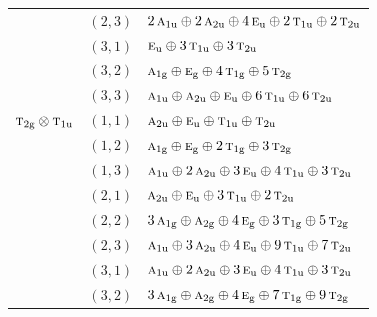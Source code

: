 \documentclass[11pt]{article}
\newcommand{\irr}[1]{\text{\normalfont\scshape #1}}
\newcommand{\ptag}[1]{\mathrm{#1}}
\begin{document}
\begin{longtable}{p{} c p{}}
 & $(2,3)$ & $2\,\irr{a}_{1\ptag{u}}\oplus 2\,\irr{a}_{2\ptag{u}}\oplus 4\,\irr{e}_{\ptag{u}}\oplus 2\,\irr{t}_{1\ptag{u}}\oplus 2\,\irr{t}_{2\ptag{u}}$\\

 & $(3,1)$ & $\irr{e}_{\ptag{u}}\oplus 3\,\irr{t}_{1\ptag{u}}\oplus 3\,\irr{t}_{2\ptag{u}}$\\

 & $(3,2)$ & $\irr{a}_{1\ptag{g}}\oplus \irr{e}_{\ptag{g}}\oplus 4\,\irr{t}_{1\ptag{g}}\oplus 5\,\irr{t}_{2\ptag{g}}$\\

 & $(3,3)$ & $\irr{a}_{1\ptag{u}}\oplus \irr{a}_{2\ptag{u}}\oplus \irr{e}_{\ptag{u}}\oplus 6\,\irr{t}_{1\ptag{u}}\oplus 6\,\irr{t}_{2\ptag{u}}$\\

\hline

$\irr{t}_{2\ptag{g}}\otimes \irr{t}_{1\ptag{u}}$ & $(1,1)$ & $\irr{a}_{2\ptag{u}}\oplus \irr{e}_{\ptag{u}}\oplus \irr{t}_{1\ptag{u}}\oplus \irr{t}_{2\ptag{u}}$\\

 & $(1,2)$ & $\irr{a}_{1\ptag{g}}\oplus \irr{e}_{\ptag{g}}\oplus 2\,\irr{t}_{1\ptag{g}}\oplus 3\,\irr{t}_{2\ptag{g}}$\\

 & $(1,3)$ & $\irr{a}_{1\ptag{u}}\oplus 2\,\irr{a}_{2\ptag{u}}\oplus 3\,\irr{e}_{\ptag{u}}\oplus 4\,\irr{t}_{1\ptag{u}}\oplus 3\,\irr{t}_{2\ptag{u}}$\\

 & $(2,1)$ & $\irr{a}_{2\ptag{u}}\oplus \irr{e}_{\ptag{u}}\oplus 3\,\irr{t}_{1\ptag{u}}\oplus 2\,\irr{t}_{2\ptag{u}}$\\

 & $(2,2)$ & $3\,\irr{a}_{1\ptag{g}}\oplus \irr{a}_{2\ptag{g}}\oplus 4\,\irr{e}_{\ptag{g}}\oplus 3\,\irr{t}_{1\ptag{g}}\oplus 5\,\irr{t}_{2\ptag{g}}$\\

 & $(2,3)$ & $\irr{a}_{1\ptag{u}}\oplus 3\,\irr{a}_{2\ptag{u}}\oplus 4\,\irr{e}_{\ptag{u}}\oplus 9\,\irr{t}_{1\ptag{u}}\oplus 7\,\irr{t}_{2\ptag{u}}$\\

 & $(3,1)$ & $\irr{a}_{1\ptag{u}}\oplus 2\,\irr{a}_{2\ptag{u}}\oplus 3\,\irr{e}_{\ptag{u}}\oplus 4\,\irr{t}_{1\ptag{u}}\oplus 3\,\irr{t}_{2\ptag{u}}$\\

 & $(3,2)$ & $3\,\irr{a}_{1\ptag{g}}\oplus \irr{a}_{2\ptag{g}}\oplus 4\,\irr{e}_{\ptag{g}}\oplus 7\,\irr{t}_{1\ptag{g}}\oplus 9\,\irr{t}_{2\ptag{g}}$\\


\end{longtable}
\end{document}
